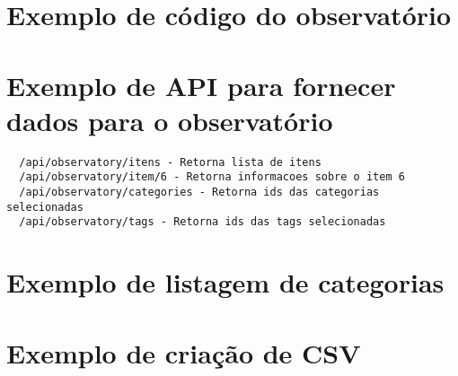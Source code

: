 \section{Exemplo de código do observatório}
\label{codigo-observatorio}



\section{Exemplo de API para fornecer dados para o observatório}
\label{api}

\begin{lstlisting}
  /api/observatory/itens - Retorna lista de itens
  /api/observatory/item/6 - Retorna informacoes sobre o item 6
  /api/observatory/categories - Retorna ids das categorias selecionadas
  /api/observatory/tags - Retorna ids das tags selecionadas
\end{lstlisting}

\section{Exemplo de listagem de categorias}



\section{Exemplo de criação de CSV}
\label{csv}


